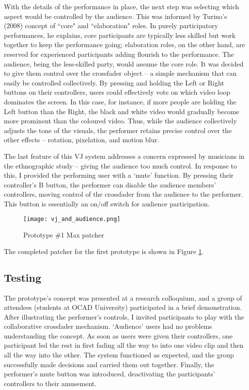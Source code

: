 With the details of the performance in place, the next step was selecting which aspect would be controlled by the audience. This was informed by Turino's (2008) concept of ``core" and ``elaboration" roles. In purely participatory performances, he explains, core participants are typically less skilled but work together to keep the performance going; elaboration roles, on the other hand, are reserved for experienced participants adding flourish to the performance. The audience, being the less-skilled party, would assume the core role. It was decided to give them control over the crossfader object -- a simple mechanism that can easily be controlled collectively. By pressing and holding the Left or Right buttons on their controllers, users could effectively vote on which video loop dominates the screen. In this case, for instance, if more people are holding the Left button than the Right, the black and white video would gradually become more prominent than the coloured video. Thus, while the audience collectively adjusts the tone of the visuals, the performer retains precise control over the other effects -- rotation, pixelation, and motion blur.

The last feature of this VJ system addresses a concern expressed by musicians in the ethnographic study -- giving the audience too much control.  In response to this, I provided the performing user with a `mute' function. By pressing their controller's B button, the performer can disable the audience members' controllers, moving control of the crossfader from the audience to the performer. This button is essentially an on/off switch for audience participation.

\begin{figure}
	\centering

	\texttt{[image: vj\_and\_audience.png]}
	\caption{Prototype \#1 Max patcher}

	\label{prototyping1.5}
\end{figure}

The completed patcher for the first prototype is shown in Figure \ref{prototyping1.5}.

\subsection{Testing}

The prototype's concept was presented at a research colloquium, and a group of attendees (students at OCAD University) participated in a brief demonstration. After illustrating the performer's controls, I invited participants to play with the collaborative crossfader mechanism. `Audience' users had no problems understanding the concept. As soon as users were given their controllers, one participant led the rest in first fading all the way to into one video clip and then all the way into the other. The system functioned as expected, and the group successfully made decisions and carried them out together. Finally, the performer's mute button was introduced, deactivating the participants' controllers to their amusement.

